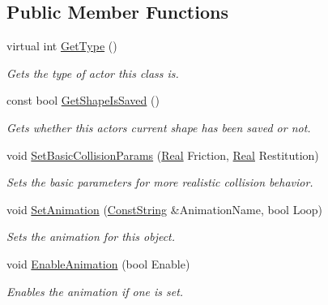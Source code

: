 \subsection*{Public Member Functions}
\begin{DoxyCompactItemize}
\item 
virtual int \hyperlink{classphys_1_1ActorBase_ab8bedea2ef0ce9194731ebeb886333ff}{GetType} ()
\begin{DoxyCompactList}\small\item\em Gets the type of actor this class is. \item\end{DoxyCompactList}\item 
const bool \hyperlink{classphys_1_1ActorBase_ace1d04b4fbb21823cde3feee83d17c2f}{GetShapeIsSaved} ()
\begin{DoxyCompactList}\small\item\em Gets whether this actors current shape has been saved or not. \item\end{DoxyCompactList}\item 
void \hyperlink{classphys_1_1ActorBase_ac60e1ebd1a08882234a6d04aff745260}{SetBasicCollisionParams} (\hyperlink{namespacephys_af7eb897198d265b8e868f45240230d5f}{Real} Friction, \hyperlink{namespacephys_af7eb897198d265b8e868f45240230d5f}{Real} Restitution)
\begin{DoxyCompactList}\small\item\em Sets the basic parameters for more realistic collision behavior. \item\end{DoxyCompactList}\item 
void \hyperlink{classphys_1_1ActorBase_a1c84866a23fdf7598462839dddae3240}{SetAnimation} (\hyperlink{namespacephys_a5ce5049f8b4bf88d6413c47b504ebb31}{ConstString} \&AnimationName, bool Loop)
\begin{DoxyCompactList}\small\item\em Sets the animation for this object. \item\end{DoxyCompactList}\item 
void \hyperlink{classphys_1_1ActorBase_a72203a9c7befd1ab606ff69af4183849}{EnableAnimation} (bool Enable)
\begin{DoxyCompactList}\small\item\em Enables the animation if one is set. \item\end{DoxyCompactList}\item 

\end{DoxyCompactItemize}
